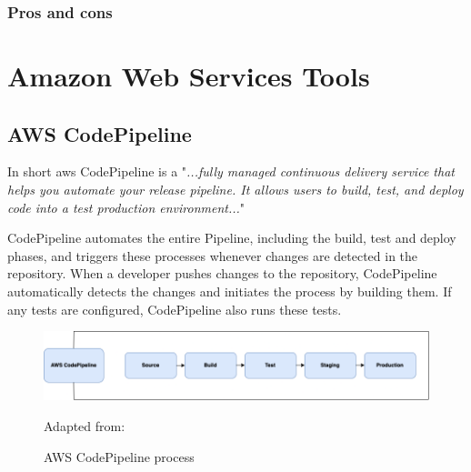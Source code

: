 \subsubsection{Pros and cons}


\section{Amazon Web Services Tools}

\subsection{AWS CodePipeline}
In short \acrshort{aws} CodePipeline is a "\textit{...fully managed continuous delivery service that helps you automate your release pipeline. It allows users to build, test, and deploy code into a test production environment...}"
\cite{AWSCodePipeline}

CodePipeline automates the entire \gls{Pipeline}, including the build, test and deploy phases, and triggers these processes whenever changes are detected in the repository. When a developer pushes changes to the repository, CodePipeline automatically detects the changes and initiates the process by building them. If any tests are configured, CodePipeline also runs these tests.\cite{AWSCodePipeline1}
\begin{figure}[H]
    \centering
    \includegraphics[scale=0.4]{Images/CodePipeline.png}
    \caption{AWS CodePipeline process}Adapted from: \cite{AWSCodePipeline2}
    \label{fig: AWS CodePipeline Process}
\end{figure}

